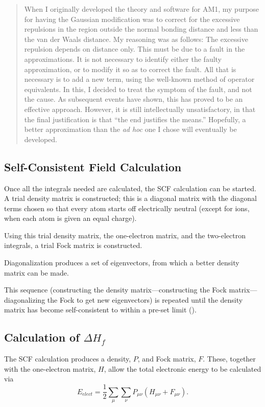 \documentclass[a4paper]{book}
\begin{document}
\begin{quote}
When I originally developed the theory and software for AM1, my purpose
for having the Gaussian modification was to correct for the excessive
repulsions in the region outside the normal bonding distance and less than the
van der Waals distance.  My reasoning was  as follows:  The excessive repulsion
depends on distance only.  This must be due to a fault in the approximations.
It is not necessary to identify either the faulty approximation, or to modify
it so as to correct the fault.  All that is necessary is to add a new term,
using the well-known method of operator equivalents. In this, I decided to treat the
symptom of the fault, and not the cause.  As subsequent events have shown, this
has proved to be an effective approach.  However, it is still intellectually
unsatisfactory, in that the final justification is that ``the end justifies
the means.''  Hopefully, a better approximation than the {\em ad hoc} one
I chose will eventually be developed.
\end{quote}

\subsection{Self-Consistent Field Calculation}
Once all the integrals needed are calculated, the SCF calculation can be
started.  A trial density matrix is constructed; this is a diagonal matrix
with the diagonal terms chosen so that every atom starts off electrically
neutral (except for ions, when each atom is given an equal charge).

Using this trial density matrix, the one-electron matrix, and the
two-electron integrals,  a trial Fock matrix is constructed.

Diagonalization produces a set of eigenvectors, from which a better
density matrix can be made.

This sequence (constructing the density matrix---constructing the Fock
matrix---diagonalizing the Fock to get new eigenvectors) is repeated until the
density matrix has become self-consistent to within a pre-set limit
().

\subsection{Calculation of $\Delta H_f$}

The SCF calculation produces a density, $P$, and Fock
matrix, $F$. These, together with the one-electron matrix, $H$,
allow the total electronic energy to be calculated via
$$
 E_{elect} = \frac{1}{2}\sum_{\mu}\sum_{\nu}P_{\mu\nu}(H_{\mu\nu}+F_{\mu\nu}).
$$
\end{document}
